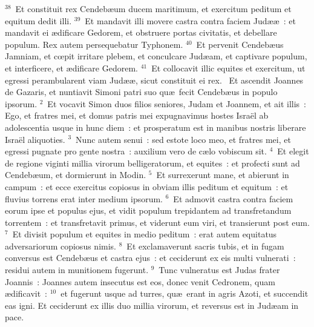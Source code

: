 ${}^{38}$~Et constituit rex Cendeb\ae um ducem maritimum, et exercitum peditum et equitum dedit illi.
${}^{39}$~Et mandavit illi movere castra contra faciem Jud\ae \ae~: et mandavit ei \ae dificare Gedorem, et obstruere portas civitatis, et debellare populum. Rex autem persequebatur Typhonem.
${}^{40}$~Et pervenit Cendeb\ae us Jamniam, et cœpit irritare plebem, et conculcare Jud\ae am, et captivare populum, et interficere, et \ae dificare Gedorem.
${}^{41}$~Et collocavit illic equites et exercitum, ut egressi perambularent viam Jud\ae \ae , sicut constituit ei rex.
~Et ascendit Joannes de Gazaris, et nuntiavit Simoni patri suo qu\ae\ fecit Cendeb\ae us in populo ipsorum.
${}^{2}$~Et vocavit Simon duos filios seniores, Judam et Joannem, et ait illis~: Ego, et fratres mei, et domus patris mei expugnavimus hostes Isra\"el ab adolescentia usque in hunc diem~: et prosperatum est in manibus nostris liberare Isra\"el aliquoties.
${}^{3}$~Nunc autem senui~: sed estote loco meo, et fratres mei, et egressi pugnate pro gente nostra~: auxilium vero de c\ae lo vobiscum sit.
${}^{4}$~Et elegit de regione viginti millia virorum belligeratorum, et equites~: et profecti sunt ad Cendeb\ae um, et dormierunt in Modin.
${}^{5}$~Et surrexerunt mane, et abierunt in campum~: et ecce exercitus copiosus in obviam illis peditum et equitum~: et fluvius torrens erat inter medium ipsorum.
${}^{6}$~Et admovit castra contra faciem eorum ipse et populus ejus, et vidit populum trepidantem ad transfretandum torrentem~: et transfretavit primus, et viderunt eum viri, et transierunt post eum.
${}^{7}$~Et divisit populum et equites in medio peditum~: erat autem equitatus adversariorum copiosus nimis.
${}^{8}$~Et exclamaverunt sacris tubis, et in fugam conversus est Cendeb\ae us et castra ejus~: et ceciderunt ex eis multi vulnerati~: residui autem in munitionem fugerunt.
${}^{9}$~Tunc vulneratus est Judas frater Joannis~: Joannes autem insecutus est eos, donec venit Cedronem, quam \ae dificavit~:
${}^{10}$~et fugerunt usque ad turres, qu\ae\ erant in agris Azoti, et succendit eas igni. Et ceciderunt ex illis duo millia virorum, et reversus est in Jud\ae am in pace.


